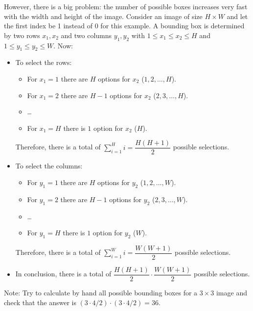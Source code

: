 However, there is a big problem: the number of possible boxes increases very fast with the width and height of the image. Consider an image of size $H\times W$ and let the first index be 1 instead of 0 for this example. A bounding box is determined by two rows $x_1, x_2$ and two columns $y_1, y_2$ with $1\leq x_1 \leq x_2 \leq H$ and $1 \leq y_1 \leq y_2 \leq W$. Now:
\begin{itemize}
    \item To select the rows:
    \begin{itemize}
        \item For $x_1=1$ there are $H$ options for $x_2$ ($1, 2, \ldots, H$).
        \item For $x_1=2$ there are $H-1$ options for $x_2$ ($2, 3, \ldots, H$).
        \item \ldots
        \item For $x_1 = H$ there is $1$ option for $x_2$ ($H$).
    \end{itemize}
    Therefore, there is a total of $\sum_{i=1}^Hi = \dfrac{H(H+1)}{2}$ possible selections.
    \item To select the columns:
    \begin{itemize}
        \item For $y_1=1$ there are $H$ options for $y_2$ ($1, 2, \ldots, W$).
        \item For $y_1=2$ there are $H-1$ options for $y_2$ ($2, 3, \ldots, W$).
        \item \ldots
        \item For $y_1 = H$ there is $1$ option for $y_2$ ($W$).
    \end{itemize}
    Therefore, there is a total of $\sum_{i=1}^Wi = \dfrac{W(W+1)}{2}$ possible selections.
    \item In conclusion, there is a total of $\dfrac{H(H+1)}{2}\cdot\dfrac{W(W+1)}{2}$ possible selections.
\end{itemize}

Note: Try to calculate by hand all possible bounding boxes for a $3\times 3$ image and check that the answer is $(3\cdot 4/2)\cdot(3\cdot 4/2) = 36$.

